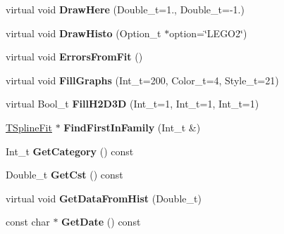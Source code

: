 \begin{DoxyCompactItemize}
\item 
\hypertarget{classTSplineFit_a0160d7ee2c749dba80d2f0db6ab891c8}{virtual void {\bfseries Draw\-Here} (Double\-\_\-t=1., Double\-\_\-t=-\/1.)}\label{classTSplineFit_a0160d7ee2c749dba80d2f0db6ab891c8}

\item 
\hypertarget{classTSplineFit_ac165f11e489be797967a3a3f07e3e133}{virtual void {\bfseries Draw\-Histo} (Option\-\_\-t $\ast$option=\char`\"{}L\-E\-G\-O2\char`\"{})}\label{classTSplineFit_ac165f11e489be797967a3a3f07e3e133}

\item 
\hypertarget{classTSplineFit_aac3ea52e6f8d99e7f284b94179b373cd}{virtual void {\bfseries Errors\-From\-Fit} ()}\label{classTSplineFit_aac3ea52e6f8d99e7f284b94179b373cd}

\item 
\hypertarget{classTSplineFit_abc4a412ff1be51b1def319603d0e34c4}{virtual void {\bfseries Fill\-Graphs} (Int\-\_\-t=200, Color\-\_\-t=4, Style\-\_\-t=21)}\label{classTSplineFit_abc4a412ff1be51b1def319603d0e34c4}

\item 
\hypertarget{classTSplineFit_aa2eab2f0febea98a7fc9c2e9d1ee1297}{virtual Bool\-\_\-t {\bfseries Fill\-H2\-D3\-D} (Int\-\_\-t=1, Int\-\_\-t=1, Int\-\_\-t=1)}\label{classTSplineFit_aa2eab2f0febea98a7fc9c2e9d1ee1297}

\item 
\hypertarget{classTSplineFit_a5f1d719a36f7302604ae9b3213c75930}{\hyperlink{classTSplineFit}{T\-Spline\-Fit} $\ast$ {\bfseries Find\-First\-In\-Family} (Int\-\_\-t \&)}\label{classTSplineFit_a5f1d719a36f7302604ae9b3213c75930}

\item 
\hypertarget{classTSplineFit_a224253ef07908dcd62013fc86efb8822}{Int\-\_\-t {\bfseries Get\-Category} () const }\label{classTSplineFit_a224253ef07908dcd62013fc86efb8822}

\item 
\hypertarget{classTSplineFit_abf9fe6c11991905b56a1265311cbac4f}{Double\-\_\-t {\bfseries Get\-Cst} () const }\label{classTSplineFit_abf9fe6c11991905b56a1265311cbac4f}

\item 
\hypertarget{classTSplineFit_ababceaec1005f76d942e5496234aa59d}{virtual void {\bfseries Get\-Data\-From\-Hist} (Double\-\_\-t)}\label{classTSplineFit_ababceaec1005f76d942e5496234aa59d}

\item 
\hypertarget{classTSplineFit_aff467a42084370a79fb4d2580944f9d3}{const char $\ast$ {\bfseries Get\-Date} () const }\label{classTSplineFit_aff467a42084370a79fb4d2580944f9d3}


\end{DoxyCompactItemize}
